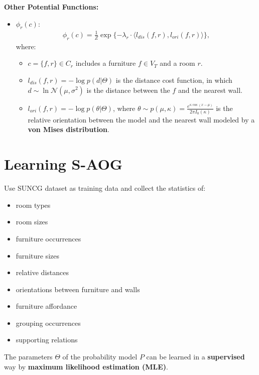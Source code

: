 \documentclass[10pt]{article}
\begin{document}
\textbf{Other Potential Functions:}
%
\begin{itemize}
  \item $\phi_r(c)$:
    \begin{align}
      \label{eq:10}
      \phi_r(c) = \frac{1}{Z} \exp\{-\lambda_r \cdot \langle l_{dis}(f, r), l_{ori}(f, r) \rangle\},
    \end{align}
    where:
    \begin{itemize}
      \item $c = \{f, r\} \in C_r$ includes a furniture $f \in V_T$ and a room
        $r$.
      \item $l_{dis}(f, r) = -\log p(d \vert \Theta)$ is the distance cost
        function, in which $d \sim \ln \mathcal{N}(\mu, \sigma^2)$ is the
        distance between the $f$ and the nearest wall.
      \item $l_{ori}(f, r) = -\log p(\theta \vert \Theta)$, where
        $\theta \sim p(\mu, \kappa) = \frac{e^{\kappa \cos (x - \mu)}}{2 \pi I_0(\kappa)} $
        is the relative orientation between the model and the nearest wall
        modeled by a \textbf{von Mises distribution}.
    \end{itemize}
\end{itemize}


\section{Learning S-AOG}%
\label{sec:learning}
Use SUNCG dataset as training data and collect the statistics of:
%
\begin{itemize}
  \item room types
  \item room sizes
  \item furniture occurrences
  \item furniture sizes
  \item relative distances
  \item orientations between furniture and walls
  \item furniture affordance
  \item grouping occurrences
  \item supporting relations
\end{itemize}
%
The parameters $\Theta$ of the probability model $P$ can be learned in a
\textbf{supervised} way by \textbf{maximum likelihood estimation (MLE)}.
\end{document}

